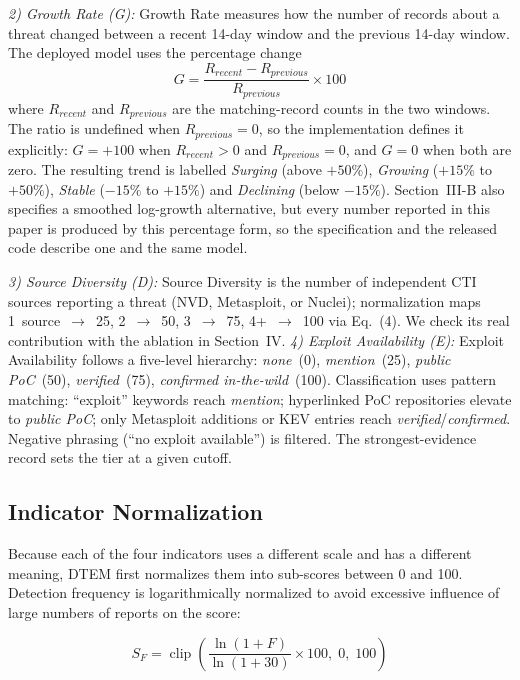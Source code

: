 \documentclass[conference]{IEEEtran}
\begin{document}
\textit{2) Growth Rate (G):} Growth Rate measures how the number of records about a threat changed between a recent 14-day window and the previous 14-day window. The deployed model uses the percentage change
\begin{equation}
G = \frac{R_{recent}-R_{previous}}{R_{previous}}\times 100
\tag{2}
\end{equation}
where $R_{recent}$ and $R_{previous}$ are the matching-record counts in the two windows. The ratio is undefined when $R_{previous}=0$, so the implementation defines it explicitly: $G=+100$ when $R_{recent}>0$ and $R_{previous}=0$, and $G=0$ when both are zero. The resulting trend is labelled \textit{Surging} (above $+50\%$), \textit{Growing} ($+15\%$ to $+50\%$), \textit{Stable} ($-15\%$ to $+15\%$) and \textit{Declining} (below $-15\%$). Section~III-B also specifies a smoothed log-growth alternative, but every number reported in this paper is produced by this percentage form, so the specification and the released code describe one and the same model.

\textit{3) Source Diversity (D):} Source Diversity is the number of independent CTI sources reporting a threat (NVD, Metasploit, or Nuclei); normalization maps 1~source~$\rightarrow$~25, 2~$\rightarrow$~50, 3~$\rightarrow$~75, 4+~$\rightarrow$~100 via Eq.~(4). We check its real contribution with the ablation in Section~IV.
\textit{4) Exploit Availability (E):} Exploit Availability follows a five-level hierarchy: \textit{none}~(0), \textit{mention}~(25), \textit{public PoC}~(50), \textit{verified}~(75), \textit{confirmed in-the-wild}~(100). Classification uses pattern matching: ``exploit'' keywords reach \textit{mention}; hyperlinked PoC repositories elevate to \textit{public PoC}; only Metasploit additions or KEV entries reach \textit{verified}/\textit{confirmed}. Negative phrasing (``no exploit available'') is filtered. The strongest-evidence record sets the tier at a given cutoff.

\subsection{Indicator Normalization}

Because each of the four indicators uses a different scale and has a different meaning, DTEM first normalizes them into sub-scores between 0 and 100. Detection frequency is logarithmically normalized to avoid excessive influence of large numbers of reports on the score:

\begin{equation}
S_F =
\operatorname{clip}
\left(
\frac{\ln(1+F)}{\ln(1+30)}\times100,\;0,\;100
\right)
\tag{3}
\end{equation}
\end{document}
